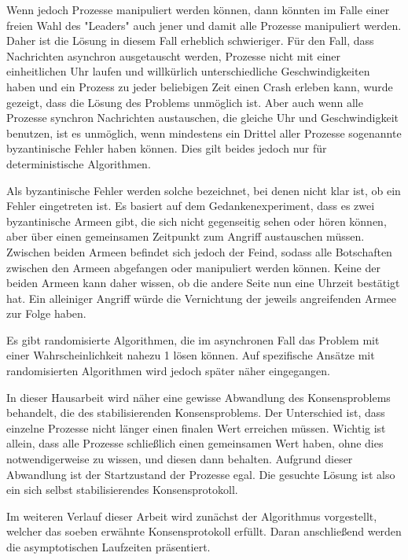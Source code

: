 \documentclass[12pt,ngerman,a4paper]{scrartcl}
\theoremstyle{plain}
\theoremstyle{definition}
\theoremstyle{remark}
\begin{document}
Wenn jedoch Prozesse manipuliert werden können, dann könnten im Falle einer freien
Wahl des "Leaders" auch jener und damit alle Prozesse manipuliert werden. Daher
ist die Lösung in diesem Fall erheblich schwieriger. Für den Fall, dass Nachrichten
asynchron ausgetauscht werden, Prozesse nicht mit einer einheitlichen Uhr
laufen und willkürlich unterschiedliche Geschwindigkeiten haben und ein Prozess
zu jeder beliebigen Zeit einen Crash erleben kann, wurde gezeigt, dass die Lösung
des Problems unmöglich ist.\cite{Fischer1985} Aber auch wenn alle Prozesse synchron
Nachrichten austauschen, die gleiche Uhr und Geschwindigkeit benutzen, ist es
unmöglich, wenn mindestens ein Drittel aller Prozesse sogenannte byzantinische
Fehler haben können.\cite{Fischer1986} Dies gilt beides jedoch nur für deterministische
Algorithmen.

Als byzantinische Fehler werden solche bezeichnet, bei denen nicht klar ist, ob
ein Fehler eingetreten ist. Es basiert auf dem Gedankenexperiment, dass es zwei
byzantinische Armeen gibt, die sich nicht gegenseitig sehen oder hören können,
aber über einen gemeinsamen Zeitpunkt zum Angriff austauschen müssen. Zwischen
beiden Armeen befindet sich jedoch der Feind, sodass alle Botschaften zwischen
den Armeen abgefangen oder manipuliert werden können. Keine der beiden Armeen
kann daher wissen, ob die andere Seite nun eine Uhrzeit bestätigt hat. Ein
alleiniger Angriff würde die Vernichtung der jeweils angreifenden Armee zur Folge
haben.

Es gibt randomisierte Algorithmen, die im asynchronen Fall das Problem mit einer
Wahrscheinlichkeit nahezu 1 lösen können.\cite{Aspnes2003} Auf spezifische Ansätze mit
randomisierten Algorithmen wird jedoch später näher eingegangen.

In dieser Hausarbeit wird näher eine gewisse Abwandlung des Konsensproblems
behandelt, die des stabilisierenden Konsensproblems. Der Unterschied ist, dass
einzelne Prozesse nicht länger einen finalen Wert erreichen müssen. Wichtig ist
allein, dass alle Prozesse schließlich einen gemeinsamen Wert haben, ohne dies
notwendigerweise zu wissen, und diesen dann behalten. Aufgrund dieser Abwandlung
ist der Startzustand der Prozesse egal. Die gesuchte Lösung ist also ein sich
selbst stabilisierendes Konsensprotokoll.

Im weiteren Verlauf dieser Arbeit wird zunächst der Algorithmus vorgestellt,
welcher das soeben erwähnte Konsensprotokoll erfüllt. Daran anschließend werden
die asymptotischen Laufzeiten präsentiert. %
\end{document}
